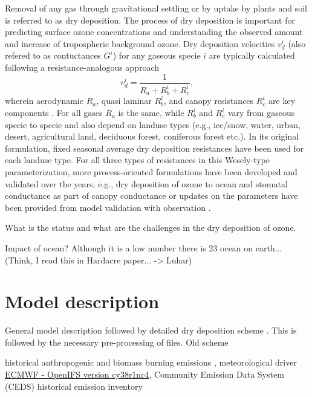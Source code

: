 \documentclass[gmd, manuscript]{copernicus}
\begin{document}
Removal of any gas through gravitational settling or by uptake by plants and soil is referred to as dry deposition. The process of dry deposition is important for predicting surface ozone concentrations and understanding the observed amount and increase of tropospheric background ozone. Dry deposition velocities $v^i_d$ (also refered to as contuctances $G^i$) for any gaseous specie $i$ are typically calculated following a resistance-analogous approach
\begin{equation}
  v^i_d = \frac{1}{R_a + R^i_b + R^i_c},
\end{equation}
wherein aerodynamic $R_a$, quasi laminar $R^i_b$, and canopy resistances $R^i_c$ are key components \citep{AE:Wesely1989}. For all gases $R_a$ is the same, while $R^i_b$ and $R^i_c$ vary from gaseous specie to specie and also depend on landuse types (e.g., ice/snow, water, urban, desert, agricultural land, deciduous forest, coniferous forest etc.). In its original formulation, fixed seasonal average dry deposition resistances have been used for each landuse type. For all three types of resistances in this Wesely-type parameterization, more process-oriented formulations have been developed and validated over the years, e.g., dry deposition of ozone to ocean \citep{ACP:Luhar2017} and stomatal conductance as part of canopy conductance \citep{PP:Buckley2017} or updates on the parameters have been provided from model validation with observation \citep[e.g., $v^\chem{O_3}_{ice/snow} = 1/10000\,\unit{cm s^{-1}}$,][]{ACP:Helmig2007}. 




What is the status and what are the challenges in the dry deposition of ozone.


Impact of ocean? Although it is a low number there is 2\/3 ocean on earth... (Think, I read this in Hardacre paper... -> Luhar)




\section{Model description}
General model description followed by detailed dry deposition scheme \citep{ACP:Simpson2012,ICP:MappingManual2017}. This is followed by the necessary pre-processing of files. Old scheme \citep{AE:Wesely1989, JGR:Hough1991}

historical anthropogenic and biomass burning emissions \citep{Lamarque2010}, meteorological driver \href{https://www.ecmwf.int/en/forecasts/documentation-and-support/evolution-ifs/cycle-38r1-summary-changes}{ECMWF - OpenIFS version cy38r1nc4}, Community Emission Data System (CEDS) historical emission inventory \citep{GMD:Hoesly2018}
\end{document}
